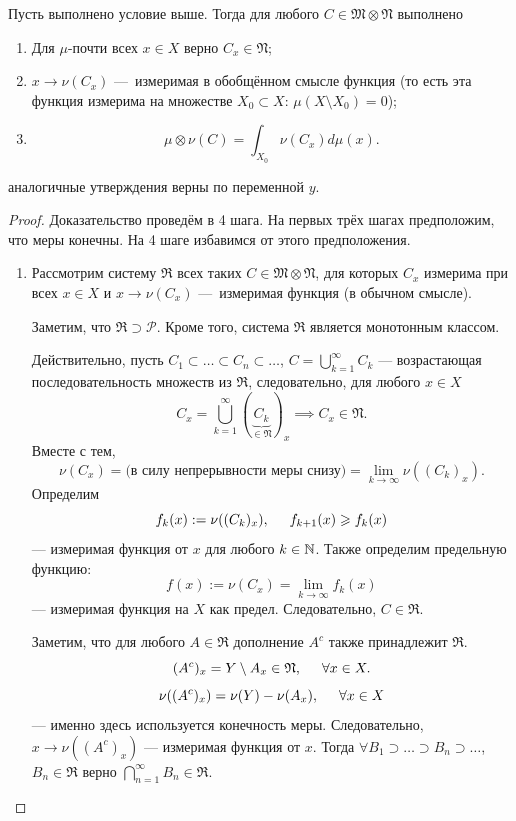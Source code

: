 \begin{theorem}
    Пусть выполнено условие выше. Тогда для любого $C \in \mathfrak{M} \otimes \mathfrak{N}$ выполнено
    \begin{enumerate}
        \item Для $\mu$-почти всех $x \in X$ верно $C_x \in \mathfrak{N}$;
        \item $x \to \nu(C_x)$ — измеримая в обобщённом смысле функция (то есть эта функция измерима на множестве $X_0 \subset X$: $\mu(X \setminus X_0) = 0$);
        \item $$\mu \otimes \nu(C) = \int_{X_0} \nu(C_x) d\mu(x).$$
    \end{enumerate}
    аналогичные утверждения верны по переменной $y$.
\end{theorem} 
\begin{proof}
    Доказательство проведём в 4 шага. На первых трёх шагах предположим, что меры конечны. На 4 шаге избавимся от этого предположения.
    \begin{enumerate}
        \item Рассмотрим систему $\mathfrak{R}$ всех таких $C \in \mathfrak{M} \otimes \mathfrak{N}$, для которых $C_x$ измерима при всех $x \in X$ и $x \to \nu(C_x)$ — измеримая функция (в обычном смысле).
        
        Заметим, что $\mathfrak{R} \supset \mathcal{P}$.
        Кроме того, система $\mathfrak{R}$ является монотонным классом.

        Действительно, пусть $C_1 \subset \dots \subset C_n \subset \dots$, $C = \bigcup\limits_{k=1}^{\infty}C_k$ — возрастающая последовательность множеств из $\mathfrak{R}$, следовательно, для любого $x \in X$
        \[C_x = \bigcup\limits_{k=1}^{\infty}(\underbrace{C_k}_{\in \mathfrak{N}})_x \implies C_x \in \mathfrak{N}.\]
        Вместе с тем,
        \[\nu(C_x) = \text{(в силу непрерывности меры снизу)} = \lim\limits_{k\to \infty}\nu((C_k)_x).\]
        Определим
        \[f_k(x):=\nu((C_k)_x), \hspace*{.5cm} f_{k+1}(x) \geqslant f_k(x)\]
        — измеримая функция от $x$ для любого $k \in \mathbb{N}$.
        Также определим предельную функцию:
        \[f(x):=\nu(C_x) = \lim\limits_{k\to \infty}f_k(x)\]
        — измеримая функция на $X$ как предел.
        Следовательно, $C \in \mathfrak{R}$.

        Заметим, что для любого $A \in \mathfrak{R}$ дополнение $A^c$ также принадлежит $\mathfrak{R}$.
        \[(A^c)_x = Y \setminus A_x \in \mathfrak{N}, \hspace*{.5cm} \forall x \in X.\]
        \[\nu((A^c)_x) = \nu(Y) - \nu(A_x), \hspace*{.5cm} \forall x \in X\]
        — именно здесь используется конечность меры.
        Следовательно, $x \to \nu((A^c)_x)$ — измеримая функция от $x$.
        Тогда $\forall B_1 \supset \dots \supset B_n \supset \dots$, $B_n \in \mathfrak{R}$ верно $\bigcap\limits_{n=1}^{\infty}B_n \in \mathfrak{R}$.


\end{enumerate}
\end{proof}
